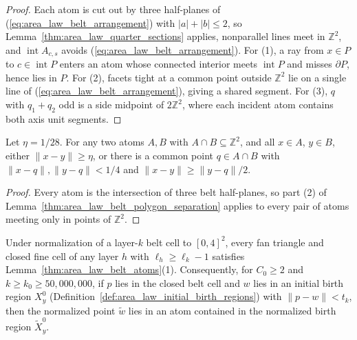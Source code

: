 \begin{proof}
    \leanok
    Each atom is cut out by three half-planes of (\ref{eq:area_law_belt_arrangement}) with
    $|a|+|b|\le2$, so Lemma~\ref{thm:area_law_quarter_sections} applies, nonparallel lines meet
    in $\mathbb Z^2$, and $\operatorname{int}A_{c,s}$ avoids (\ref{eq:area_law_belt_arrangement}).
    For (1), a ray from $x\in P$ to $c\in\operatorname{int}P$ enters an atom whose connected
    interior meets $\operatorname{int}P$ and misses $\partial P$, hence lies in $P$.
    For (2), facets tight at a common point outside $\mathbb Z^2$ lie on a single line of
    (\ref{eq:area_law_belt_arrangement}), giving a shared segment. For (3), $q$ with $q_1+q_2$ odd
    is a side midpoint of $2\mathbb Z^2$, where each incident atom contains both axis unit segments.
\end{proof}

\begin{lemma}
    \label{thm:area_law_belt_atom_dichotomy}
    \leanok
    Let $\eta=1/28$. For any two atoms $A,B$ with
    $A\cap B\subseteq\mathbb Z^2$, and all $x\in A$, $y\in B$, either
    $\|x-y\|\ge\eta$, or there is a common point $q\in A\cap B$ with
    $\|x-q\|,\|y-q\|<1/4$ and $\|x-y\|\ge\|y-q\|/2$.
\end{lemma}

\begin{proof}
    \leanok
    Every atom is the intersection of three belt half-planes, so part (2)
    of Lemma~\ref{thm:area_law_belt_polygon_separation} applies to every
    pair of atoms meeting only in points of $\mathbb Z^2$.
\end{proof}

\begin{lemma}
    \label{thm:area_law_belt_cell_local_atoms}
    \leanok
    Under normalization of a layer-$k$ belt cell to $[0,4]^2$, every fan triangle and closed
    fine cell of any layer $h$ with $\ell_h\ge\ell_k-1$ satisfies Lemma~\ref{thm:area_law_belt_atoms}(1).
    Consequently, for $C_0\ge2$ and $k\ge k_0\ge50{,}000{,}000$, if $p$ lies in the closed belt
    cell and $w$ lies in an initial birth region $X_y^0$ (Definition~\ref{def:area_law_initial_birth_regions})
    with $\|p-w\|<t_k$, then the normalized point $\tilde w$ lies in an atom contained in the
    normalized birth region $\tilde X_y^0$.
\end{lemma}

